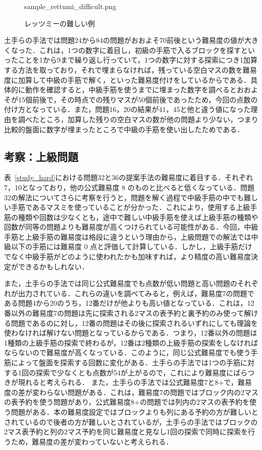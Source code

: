 \documentclass[submit,techrep,noauthor]{ipsj}
\begin{document}
\begin{figure}[tb]
\begin{minipage}[t]{0.5\columnwidth}
      		{sample_rettumi_difficult.png}
 	\caption{レッツミーの難しい例}
 	\label{sample_rettumi_difficult}
	\end{minipage}
	\end{figure}

土手らの手法では問題24から84の問題がおおよそ70前後という難易度の値が大きくなった．これは，1つの数字に着目し，初級の手筋で入るブロックを探すといったことを1から9まで繰り返し行っていて，1つの数字に対する探索につき1加算する方法を取っており，それで埋まらなければ，残っている空白マスの数を難易度に加算して中級の手筋で解く，といった難易度付けをしているからである．具体的に動作を確認すると，中級手筋を使うまでに埋まった数字を調べるとおおよそが15個前後で，その時点での残りマスが50個前後であったため，今回の点数の付け方となっている．また，問題16，20の結果が41，45と他と違う値になった理由を調べたところ，加算した残りの空白マスの数が他の問題より少ない，つまり比較的盤面に数字が埋まったところで中級の手筋を使い出したためである．


\subsection{考察：上級問題}
表~\ref{study_hard}における問題32と36の提案手法の難易度に着目する．それぞれ7，10となっており，他の公式難易度 8 のものと比べると低くなっている．問題32の解法についてさらに考察を行うと，問題を解く過程で中級手筋の中でも難しい手筋であるマスミを使っていることが分かった．これにより，使用する上級手筋の種類や回数は少なくとも，途中で難しい中級手筋を使えば上級手筋の種類や回数が同等の問題よりも難易度が高くつけられている可能性がある．今回，中級手筋と上級手筋の難易度は格段に違うという理由から，上級問題での解法では中級以下の手筋には難易度 0 点と評価して計算している．しかし，上級手筋だけでなく中級手筋がどのように使われたかも加味すれば，より精度の高い難易度決定ができるかもしれない．

また，土手らの手法では同じ公式難易度でも点数が低い問題と高い問題のそれぞれが出力されている．これらの違いを調べてみると，例えば，難易度7の問題である問題4から20のうち，12番だけが他よりも高い値となっている．これは，12番以外の難易度7の問題は先に探索される2マスの表予約と裏予約のみ使って解ける問題であるのに対し，12番の問題はその後に探索されるいずれにしても理論を使わなければ解けない問題となっているからである．つまり，12番以外の問題は1種類の上級手筋の探索で終わるが，12番は2種類の上級手筋の探索をしなければならないので難易度が高くなっている．このように，同じ公式難易度でも使う手筋によって盤面を探索する回数に変化がある．土手らの手法では1つの手筋に対する1回の探索で少なくとも点数が54が上がるので，これにより難易度にばらつきが現れると考えられる．
また，土手らの手法では公式難易度7と8+で，難易度の差が変わらない問題がある．これは，難易度7の問題ではブロック内の2マスの表予約を使う問題があり，公式難易度8+の問題では列内の2マスの表予約を使う問題がある．本の難易度設定ではブロックよりも列にある予約の方が難しいとされているので後者の方が難しいとされているが，土手らの手法ではブロックの2マス表予約と列の2マス予約を同じ難易度と見なし1回の探索で同時に探索を行うため，難易度の差が変わっていないと考えられる．
\end{document}
